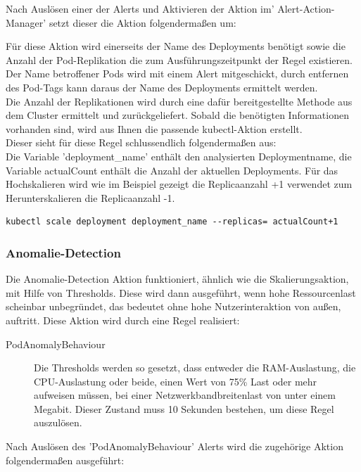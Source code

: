 \documentclass[a4paper,10pt]{scrartcl}
\begin{document}
Nach Auslösen einer der Alerts und Aktivieren der Aktion im' Alert-Action-Manager' setzt dieser die Aktion folgendermaßen um:

Für diese Aktion wird einerseits der Name des Deployments benötigt sowie die Anzahl der Pod-Replikation die zum Ausführungszeitpunkt der Regel existieren.\\
Der Name betroffener Pods wird mit einem Alert mitgeschickt, durch entfernen des Pod-Tags kann daraus der Name des Deployments ermittelt werden.\\
Die Anzahl der Replikationen wird durch eine dafür bereitgestellte Methode aus dem Cluster ermittelt und zurückgeliefert.
Sobald die benötigten Informationen vorhanden sind, wird aus Ihnen die passende kubectl-Aktion erstellt.\\
Dieser sieht für diese Regel schlussendlich folgendermaßen aus:\\
Die Variable 'deployment\_name' enthält den analysierten Deploymentname, die Variable actualCount enthält die Anzahl der aktuellen Deployments.
Für das Hochskalieren wird wie im Beispiel gezeigt die Replicaanzahl +1 verwendet zum Herunterskalieren die Replicaanzahl -1.

\begin{lstlisting}
kubectl scale deployment deployment_name --replicas= actualCount+1
\end{lstlisting}

\subsubsection{Anomalie-Detection}

Die Anomalie-Detection Aktion funktioniert, ähnlich wie die Skalierungsaktion, mit Hilfe von Thresholds. Diese wird dann ausgeführt, wenn hohe Ressourcenlast scheinbar unbegründet, das bedeutet ohne hohe Nutzerinteraktion von außen, auftritt.
Diese Aktion wird durch eine Regel realisiert:

\begin{description}
\item[PodAnomalyBehaviour]
Die Thresholds werden so gesetzt, dass entweder die RAM-Auslastung, die CPU-Auslastung oder beide, einen Wert von 75\% Last oder mehr aufweisen müssen, bei einer Netzwerkbandbreitenlast von unter einem Megabit. Dieser Zustand muss 10 Sekunden bestehen, um diese Regel auszulösen.
\end{description}

Nach Auslösen des 'PodAnomalyBehaviour' Alerts wird die zugehörige Aktion folgendermaßen ausgeführt:\\
\end{document}
